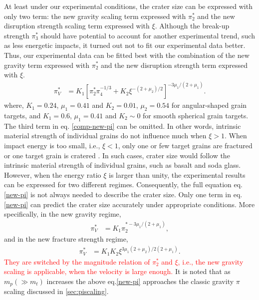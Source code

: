 \documentclass[3p,authoryear]{elsarticle}
\newcommand{\red}[1]{\textcolor{red}{#1}}
\begin{document}
At least under our experimental conditions, the crater size can be expressed with only two term: the new gravity scaling term expressed with $\pi_2^*$ and the new disruption strength scaling term expressed with $\xi$.
Although the break-up strength $\pi_3^*$ should have potential to account for another experimental trend, such as less energetic impacts, it turned out not to fit our experimental data better.
Thus, our experimental data can be fitted best with the combination of the new gravity term expressed with $\pi_2^*$ and the new disruption strength term expressed with $\xi$.
\begin{align}
	\pi_V^*&=K_1\left[\pi_2^{*}\pi_4^{-1/3}+K_2\xi^{-(2+\mu_2)/2}\right]^{-3\mu_1/(2+\mu_1)}. \label{new-pi}
\end{align}
where, $K_1=0.24 $, $\mu_1=0.41$ and $K_2=0.01$, $\mu_2=0.54$ for angular-shaped grain targets, and $K_1=0.6 $, $\mu_1=0.41$ and $K_2\sim 0$ for smooth spherical grain targets.
The third term in eq. \eqref{comp-new-pi} can be omitted.
In other words, intrinsic material strength of individual grains do not influence much when $\xi>1$.
When impact energy is too small, i.e., $\xi<1$, only one or few target grains are fractured or one target grain is cratered \citep{guettler2012}.
In such cases, crater size would follow the intrinsic material strength of individual grains, such as basalt and soda glass.
However, when the energy ratio $\xi$ is larger than unity, the experimental results can be expressed for two different regimes. 
Consequently, the full equation eq.\eqref{new-pi} is not always needed to describe the crater size. Only one term in eq.\eqref{new-pi} can predict the crater size accurately under appropriate conditions. 
More specifically, in the new gravity regime,
\begin{align}
	\pi_V^*&=K_1\pi_2^{*-3\mu_1/(2+\mu_1)}, \label{newgravity}
\end{align}
and in the new fracture strength regime,
\begin{align}
	\pi_V^*&=K_1K_2\xi^{3\mu_1(2+\mu_2)/2(2+\mu_1)}. \label{newstrength}
\end{align}
\red{They are switched by the magnitude relation of $\pi_2^*$ and $\xi$, i.e., the new gravity scaling is applicable, when the velocity is large enough.}
It is noted that as $m_p(\gg m_t)$ increases the above eq.\eqref{new-pi} approaches the classic gravity $\pi$ scaling discussed in \ref{sec:piscaling}.
\end{document}
